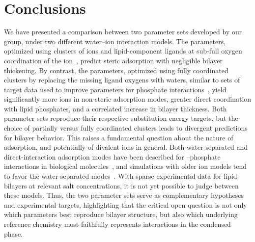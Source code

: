 \section{Conclusions}
We have presented a comparison between
two \mg{} parameter sets developed by our
group, under two different water–ion
interaction models. The 
parameters, optimized using clusters of
ions and lipid-component ligands at
sub-full oxygen coordination of the
ion~\cite{saunders:2024}, predict steric
adsorption with negligible bilayer
thickening. By contrast, the 
parameters, optimized using fully
coordinated clusters by replacing the
missing ligand oxygens with
waters, similar to sets of target data used to improve parameters for  phosphate interactions~\cite{julian:2023:mg}, yield
significantly more ions in non-steric
adsorption modes, greater direct
coordination with lipid phosphates, and a
correlated increase in bilayer thickness.
Both parameter sets reproduce their
respective substitution energy targets,
but the choice of partially versus fully
coordinated clusters leads to divergent
predictions for bilayer behavior.
 This raises a fundamental question about the nature of
\mg{} adsorption, and potentially of
divalent ions in general. Both
water-separated and direct-interaction
adsorption modes have been described for
\mg{}–phosphate interactions in biological
molecules~\cite{grotz:thesis,micro,grotz:2021:optimized,
villaparams,dudev:2003,rulivsek:2003:outer,
porschke:1979:mode,bowman:2012,fingerhut:2021:contact},
and simulations with older ion models tend
to favor the water-separated
modes~\cite{grotz:thesis,micro,grotz:2021:optimized,
villaparams,puyo:2022:consistent}. With
sparse experimental data for lipid bilayers
at relevant salt concentrations, it is not
yet possible to judge between these models.
Thus, the two parameter sets serve as
complementary hypotheses and experimental
targets, highlighting that the critical open
question is not only which parameters best
reproduce bilayer structure, but also which
underlying reference chemistry most
faithfully represents 
interactions in the condensed phase.

\FloatBarrier
